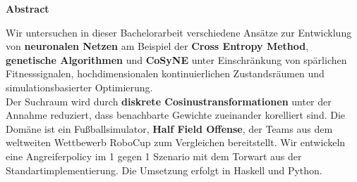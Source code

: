 %
%
\vspace*{2cm}

\begin{center}
    \textbf{Abstract}
\end{center}

\vspace*{1cm}

\noindent Wir untersuchen in dieser Bachelorarbeit verschiedene Ansätze zur Entwicklung von \textbf{neuronalen Netzen} am Beispiel der \textbf{Cross Entropy Method}, \textbf{genetische Algorithmen} und \textbf{CoSyNE} unter Einschränkung von spärlichen Fitnesssignalen, hochdimensionalen kontinuierlichen Zustandsräumen und simulationsbasierter Optimierung. \\[2mm]
Der Suchraum wird durch \textbf{diskrete Cosinustransformationen} unter der Annahme reduziert, dass benachbarte Gewichte zueinander korelliert sind. Die Domäne ist ein Fußballsimulator, \textbf{Half Field Offense}, der Teams aus dem weltweiten Wettbewerb RoboCup zum Vergleichen bereitstellt. Wir entwickeln eine Angreiferpolicy im 1 gegen 1 Szenario mit dem Torwart aus der Standartimplementierung. Die Umsetzung erfolgt in Haskell und Python. 